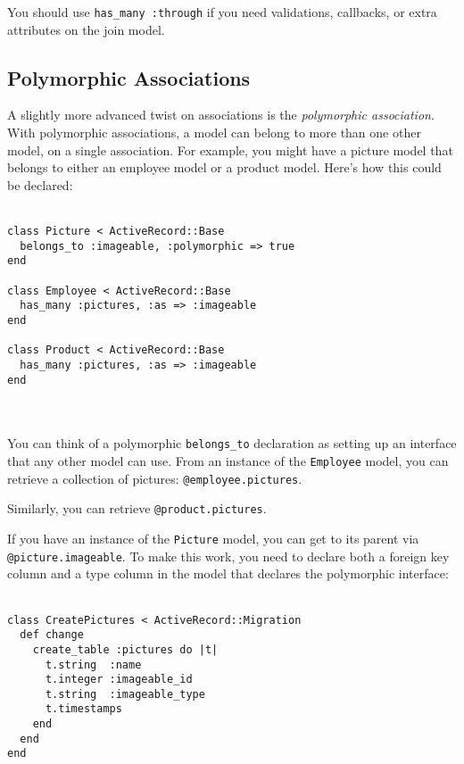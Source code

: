 \documentclass[10pt]{book}
\begin{document}
You should use \texttt{has\_many :through} if you need validations, callbacks, or extra attributes on the join model.

\subsection{ Polymorphic Associations}

A slightly more advanced twist on associations is the \emph{polymorphic association}.  With polymorphic associations, a model can belong to more than one  other model, on a single association. For example, you might have a  picture model that belongs to either an employee model or a product  model. Here’s how this could be declared:
\\ \\
\begin{minipage}{\textwidth}{\scriptsize
\begin{verbatim}
class Picture < ActiveRecord::Base
  belongs_to :imageable, :polymorphic => true
end
 
class Employee < ActiveRecord::Base
  has_many :pictures, :as => :imageable
end
 
class Product < ActiveRecord::Base
  has_many :pictures, :as => :imageable
end
\end{verbatim}}
\end{minipage}
\\ \\

You can think of a polymorphic \texttt{belongs\_to} declaration as setting up an interface that any other model can use. From an instance of the \texttt{Employee} model, you can retrieve a collection of pictures: \texttt{@employee.pictures}.

Similarly, you can retrieve \texttt{@product.pictures}.

If you have an instance of the \texttt{Picture} model, you can get to its parent via \texttt{@picture.imageable}.  To make this work, you need to declare both a foreign key column and a  type column in the model that declares the polymorphic interface:
\\ \\
\begin{minipage}{\textwidth}{\scriptsize
\begin{verbatim}
class CreatePictures < ActiveRecord::Migration
  def change
    create_table :pictures do |t|
      t.string  :name
      t.integer :imageable_id
      t.string  :imageable_type
      t.timestamps
    end
  end
end
\end{verbatim}}
\end{minipage}
\\ \\
\end{document}
